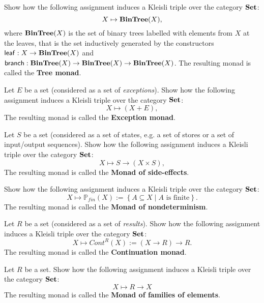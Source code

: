 \begin{exer}\label{exer:kleisli_triple_bintree} Show how the following assignment induces a Kleisli triple over the category $\mathbf{Set}$:
\[
X\mapsto \mathbf{BinTree}(X),
\]
where $\mathbf{BinTree}(X)$ is the set of binary trees labelled with elements from $X$ at the leaves, that is the set inductively generated by the constructors $\mathsf{leaf}: X\to \mathbf{BinTree}(X)$ and $\mathsf{branch} : \mathbf{BinTree}(X)\to \mathbf{BinTree}(X)\to \mathbf{BinTree}(X)$.
The resulting monad is called the \textbf{Tree monad}.
\end{exer}

\begin{exer}\label{exer:kleisli_triple_exception} Let $E$ be a set (considered as a set of \textit{exceptions}). Show how the following assignment induces a Kleisli triple over the category $\mathbf{Set}$:
\[
X\mapsto (X + E),
\]
The resulting monad is called the \textbf{Exception monad}.
\end{exer}

\begin{exer}\label{exer:kleisli_triple_side_effects} Let $S$ be a set (considered as a set of states, e.g. a set of stores or a set of input/output sequences). Show how the following assignment induces a Kleisli triple over the category $\mathbf{Set}$:
\[
X\mapsto S \to (X \times S),
\]
The resulting monad is called the \textbf{Monad of side-effects}.
\end{exer}

\begin{exer}\label{exer:kleisli_triple_nondeterminism} Show how the following assignment induces a Kleisli triple over the category $\mathbf{Set}$:
\[
X\mapsto \mathbb{P}_{fin}(X) := \left\{A\subseteq X \mid  A \text{ is finite}\right\}.
\]
The resulting monad is called the \textbf{Monad of nondeterminism}.
\end{exer}


\begin{exer}\label{exer:kleisli_triple_continuation} Let $R$ be a set (considered as a set of \textit{results}). Show how the following assignment induces a Kleisli triple over the category $\mathbf{Set}$:
\[
X\mapsto Cont^R(X) := (X \to R) \to R.
\]
The resulting monad is called the \textbf{Continuation monad}.
\end{exer}


\begin{exer}\label{exer:kleisli_triple_familiesofelements} Let $R$ be a set. Show how the following assignment induces a Kleisli triple over the category $\mathbf{Set}$: 
\[
X \mapsto R \to X
\]
The resulting monad is called the \textbf{Monad of families of elements}.

\end{exer}


